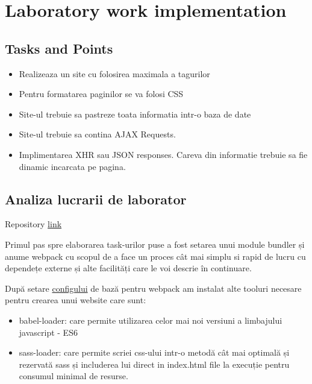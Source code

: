 \section{Laboratory work implementation}

\subsection{Tasks and Points}

\begin{itemize}
	\item Realizeaza un site cu folosirea maximala a tagurilor
	\item Pentru formatarea paginilor se va folosi CSS
	\item Site-ul trebuie sa pastreze toata informatia intr-o baza de date
	\item Site-ul trebuie sa contina AJAX Requests.
	\item Implimentarea XHR sau JSON responses. Careva din informatie trebuie sa fie dinamic incarcata pe pagina.
\end{itemize}

\subsection{Analiza lucrarii de laborator}
Repository \href{https://github.com/AScripnic/MIDPS-laboratories/tree/master/Lab%233}{link}\par

Primul pas spre elaborarea task-urilor puse a fost setarea unui module bundler și anume webpack \cite{webpack} cu scopul de a face un proces cât mai simplu si rapid de lucru cu dependețe externe și alte facilități care le voi descrie în continuare.\par

După setare \href{https://github.com/AScripnic/MIDPS-laboratories/blob/master/Lab%233/website/webpack.config.js}{configului} de bază pentru webpack am instalat alte tooluri necesare pentru crearea unui website care sunt:

\begin{itemize}
 \item babel-loader: care permite utilizarea celor mai noi versiuni a limbajului javascript - ES6\cite{es6}
 \item sass-loader: care permite scriei css-ului intr-o metodă cât mai optimală și rezervată sass\cite{sass} și includerea lui direct in index.html file la execuție pentru consumul minimal de resurse.
\end{itemize}

